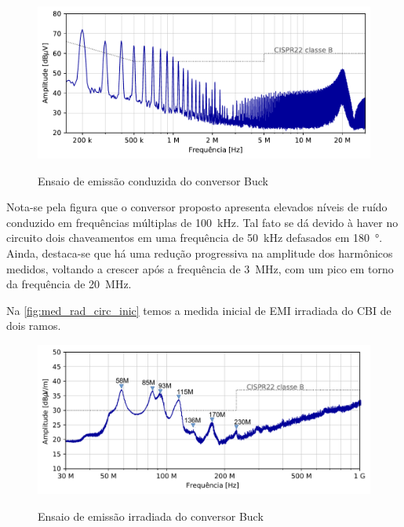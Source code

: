     \begin{figure}[H]
    	\centering
    	\caption{Ensaio de emissão conduzida do conversor Buck \Interleaved}
    	\includegraphics[scale=.9]{pdf/cond/Circuito inicial.pdf}
    	\label{fig:med_cond_circ_inic}
    \end{figure}
    
    Nota-se pela figura que o conversor proposto apresenta elevados níveis de ruído conduzido em frequências múltiplas de \SI{100}{\kilo\hertz}. Tal fato se dá devido à haver no circuito dois chaveamentos em uma frequência de \SI{50}{\kilo\hertz} defasados em \SI{180}{\degree}. Ainda, destaca-se que há uma redução progressiva na amplitude dos harmônicos medidos, voltando a crescer após a frequência de \SI{3}{\mega\hertz}, com um pico em torno da frequência de \SI{20}{\mega\hertz}.
    
    Na \autoref{fig:med_rad_circ_inic} temos a medida inicial de EMI irradiada do CBI de dois ramos. 
    
    \begin{figure}[H]
    	\centering
    	\caption{Ensaio de emissão irradiada do conversor Buck \Interleaved}
    	\includegraphics[scale=.9]{pdf/rad/Circuito inicial_2.pdf}
    	\label{fig:med_rad_circ_inic}
    \end{figure}
    
